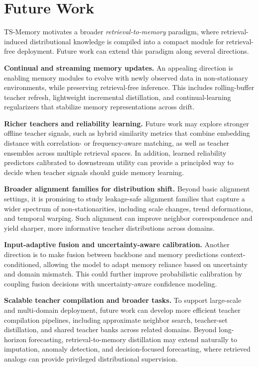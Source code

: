 \section{Future Work}
\label{sec:future_work}
TS-Memory motivates a broader \emph{retrieval-to-memory} paradigm, where retrieval-induced distributional knowledge is compiled into a compact module for retrieval-free deployment. Future work can extend this paradigm along several directions.

\noindent\textbf{Continual and streaming memory updates.}
An appealing direction is enabling memory modules to evolve with newly observed data in non-stationary environments, while preserving retrieval-free inference.
This includes rolling-buffer teacher refresh, lightweight incremental distillation, and continual-learning regularizers that stabilize memory representations across drift.

\noindent\textbf{Richer teachers and reliability learning.}
Future work may explore stronger offline teacher signals, such as hybrid similarity metrics that combine embedding distance with correlation- or frequency-aware matching, as well as teacher ensembles across multiple retrieval spaces.
In addition, learned reliability predictors calibrated to downstream utility can provide a principled way to decide when teacher signals should guide memory learning.

\noindent\textbf{Broader alignment families for distribution shift.}
Beyond basic alignment settings, it is promising to study leakage-safe alignment families that capture a wider spectrum of non-stationarities, including scale changes, trend deformations, and temporal warping.
Such alignment can improve neighbor correspondence and yield sharper, more informative teacher distributions across domains.

\noindent\textbf{Input-adaptive fusion and uncertainty-aware calibration.}
Another direction is to make fusion between backbone and memory predictions context-conditioned, allowing the model to adapt memory reliance based on uncertainty and domain mismatch.
This could further improve probabilistic calibration by coupling fusion decisions with uncertainty-aware confidence modeling.

\noindent\textbf{Scalable teacher compilation and broader tasks.}
To support large-scale and multi-domain deployment, future work can develop more efficient teacher compilation pipelines, including approximate neighbor search, teacher-set distillation, and shared teacher banks across related domains.
Beyond long-horizon forecasting, retrieval-to-memory distillation may extend naturally to imputation, anomaly detection, and decision-focused forecasting, where retrieved analogs can provide privileged distributional supervision.




















